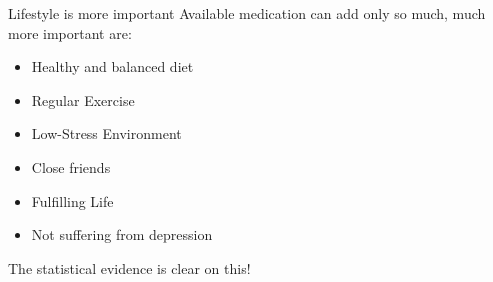 \begin{frame}[c]{Lifestyle is more important}
    \large
    Available medication can add only so much, much more important are:

    \begin{itemize}[<+(1)->]
        \item Healthy and balanced diet \cite{willcox2007caloric}
        \item Regular Exercise \cite{lee1995exercise}
        \item Low-Stress Environment
        \item Close friends \cite{olsen1991social}
        \item Fulfilling Life \cite{diener2011happy}
        \item Not suffering from depression \cite{cuijpers2002excess}
    \end{itemize}
    \pause
    The statistical evidence is clear on this!
\end{frame}
